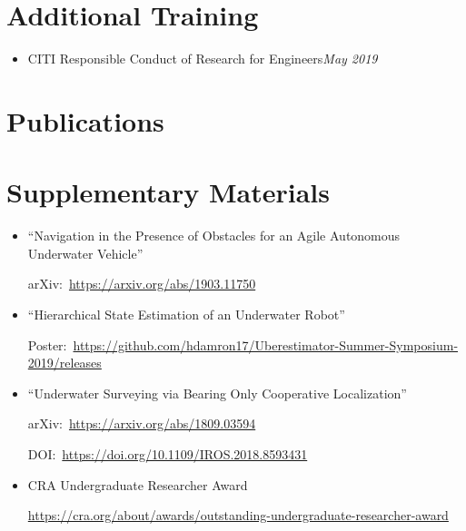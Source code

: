 \documentclass[\ifdefined\cv11pt\else10pt\fi,letterpaper,roman]{moderncv}
\newcommand{\cvonly}[1]{\ifdefined\cv#1\fi}
\renewcommand{\cvitem}[2]{\item {#1}\hfill\textit{#2}}
\let\oldsection\section
\renewcommand{\section}[1]{\vspace*{-1.3ex}\oldsection{#1}\vspace*{-0.5ex}}
\begin{document}
\cvonly{
\section{Additional Training}
\begin{itemize}
	\cvitem{CITI Responsible Conduct of Research for Engineers}{May 2019}
\end{itemize}
}


\section{Publications}
	\printbibliography[heading=none]{}

\newpage
\section{Supplementary Materials}
\begin{itemize}[itemsep=1ex]
	\item ``Navigation in the Presence of Obstacles for an Agile Autonomous Underwater Vehicle''~\cite{marios_trajopt} \par
	arXiv:\ \url{https://arxiv.org/abs/1903.11750}
	\item ``Hierarchical State Estimation of an Underwater Robot''~\cite{damron2019} \par
	Poster:\ \url{https://github.com/hdamron17/Uberestimator-Summer-Symposium-2019/releases}
	\item ``Underwater Surveying via Bearing Only Cooperative Localization''~\cite{uwcl} \par
	arXiv:\ \url{https://arxiv.org/abs/1809.03594} \par
	DOI:\ \url{https://doi.org/10.1109/IROS.2018.8593431}
	\item CRA Undergraduate Researcher Award \par
	\url{https://cra.org/about/awards/outstanding-undergraduate-researcher-award}
\end{itemize}
\end{document}
